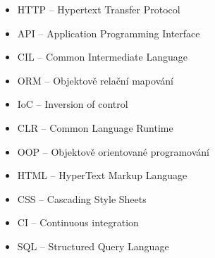 \documentclass[12pt,a4paper]{report}
\begin{document}



\tableofcontents











\listoffigures


\begin{itemize}
	\item HTTP -- Hypertext Transfer Protocol
	\item API -- Application Programming Interface
	\item CIL -- Common Intermediate Language
	\item ORM -- Objektově relační mapování
	\item IoC -- Inversion of control
	\item CLR -- Common Language Runtime
	\item OOP -- Objektově orientované programování
	\item HTML -- HyperText Markup Language 
	\item CSS -- Cascading Style Sheets
	\item CI -- Continuous integration
	\item SQL -- Structured Query Language
	
\end{itemize}

\appendix
\end{document}
